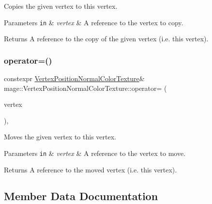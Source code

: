 Copies the given vertex to this vertex.


\begin{DoxyParams}[1]{Parameters}
\mbox{\tt in}  & {\em vertex} & A reference to the vertex to copy. \\
\hline
\end{DoxyParams}
\begin{DoxyReturn}{Returns}
A reference to the copy of the given vertex (i.\+e. this vertex). 
\end{DoxyReturn}
\hypertarget{structmage_1_1_vertex_position_normal_color_texture_a495b54b0ea751f40d53abc2ffc336557}{}\label{structmage_1_1_vertex_position_normal_color_texture_a495b54b0ea751f40d53abc2ffc336557} 
\subsubsection{\texorpdfstring{operator=()}{operator=()}\hspace{0.1cm}{\footnotesize\ttfamily [2/2]}}
{\footnotesize\ttfamily constexpr \hyperlink{structmage_1_1_vertex_position_normal_color_texture}{Vertex\+Position\+Normal\+Color\+Texture}\& mage\+::\+Vertex\+Position\+Normal\+Color\+Texture\+::operator= (\begin{DoxyParamCaption}\item[{\hyperlink{structmage_1_1_vertex_position_normal_color_texture}{Vertex\+Position\+Normal\+Color\+Texture} \&\&}]{vertex }\end{DoxyParamCaption})\hspace{0.3cm}{\ttfamily [default]}, {\ttfamily [noexcept]}}

Moves the given vertex to this vertex.


\begin{DoxyParams}[1]{Parameters}
\mbox{\tt in}  & {\em vertex} & A reference to the vertex to move. \\
\hline
\end{DoxyParams}
\begin{DoxyReturn}{Returns}
A reference to the moved vertex (i.\+e. this vertex). 
\end{DoxyReturn}


\subsection{Member Data Documentation}
\hypertarget{structmage_1_1_vertex_position_normal_color_texture_a65ebae1d87000c53290ac7fd44f0bfce}{}\label{structmage_1_1_vertex_position_normal_color_texture_a65ebae1d87000c53290ac7fd44f0bfce} 
